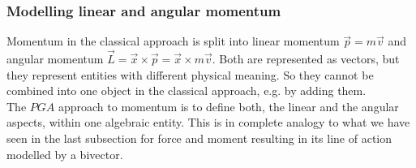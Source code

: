 

\newpage

\subsubsection{Modelling linear and angular momentum}
\label{subsubsection:modelling_momentum}

Momentum in the classical approach is split into linear momentum $\vec{p} = m\vec{v}$ and
angular momentum $\vec{L} = \vec{x} \times \vec{p} = \vec{x} \times m \vec{v}$. Both are
represented as vectors, but they represent entities with different physical meaning. So
they cannot be combined into one object in the classical approach, e.g. by adding them. \\

The $PGA$ approach to momentum is to define both, the linear and the angular aspects,
within one algebraic entity. This is in complete analogy to what we have seen in the last
subsection for force and moment resulting in its line of action modelled by a bivector.

